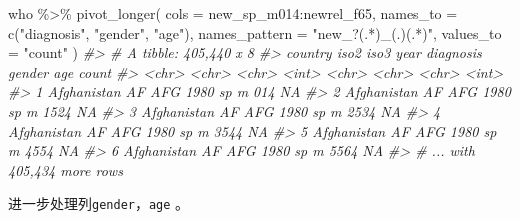 \documentclass[
]{book}
\newenvironment{Shaded}{\begin{snugshade}}{\end{snugshade}}
\newcommand{\AttributeTok}[1]{\textcolor[rgb]{0.77,0.63,0.00}{#1}}
\newcommand{\CommentTok}[1]{\textcolor[rgb]{0.56,0.35,0.01}{\textit{#1}}}
\newcommand{\FunctionTok}[1]{\textcolor[rgb]{0.00,0.00,0.00}{#1}}
\newcommand{\NormalTok}[1]{#1}
\newcommand{\SpecialCharTok}[1]{\textcolor[rgb]{0.00,0.00,0.00}{#1}}
\newcommand{\StringTok}[1]{\textcolor[rgb]{0.31,0.60,0.02}{#1}}
\begin{document}
\begin{Shaded}
\begin{Highlighting}[]
\NormalTok{who }\SpecialCharTok{\%\textgreater{}\%} \FunctionTok{pivot\_longer}\NormalTok{(}
  \AttributeTok{cols =}\NormalTok{ new\_sp\_m014}\SpecialCharTok{:}\NormalTok{newrel\_f65,}
  \AttributeTok{names\_to =} \FunctionTok{c}\NormalTok{(}\StringTok{"diagnosis"}\NormalTok{, }\StringTok{"gender"}\NormalTok{, }\StringTok{"age"}\NormalTok{), }
  \AttributeTok{names\_pattern =} \StringTok{"new\_?(.*)\_(.)(.*)"}\NormalTok{,}
  \AttributeTok{values\_to =} \StringTok{"count"}
\NormalTok{)}
\CommentTok{\#\textgreater{} \# A tibble: 405,440 x 8}
\CommentTok{\#\textgreater{}   country     iso2  iso3   year diagnosis gender age   count}
\CommentTok{\#\textgreater{}   \textless{}chr\textgreater{}       \textless{}chr\textgreater{} \textless{}chr\textgreater{} \textless{}int\textgreater{} \textless{}chr\textgreater{}     \textless{}chr\textgreater{}  \textless{}chr\textgreater{} \textless{}int\textgreater{}}
\CommentTok{\#\textgreater{} 1 Afghanistan AF    AFG    1980 sp        m      014      NA}
\CommentTok{\#\textgreater{} 2 Afghanistan AF    AFG    1980 sp        m      1524     NA}
\CommentTok{\#\textgreater{} 3 Afghanistan AF    AFG    1980 sp        m      2534     NA}
\CommentTok{\#\textgreater{} 4 Afghanistan AF    AFG    1980 sp        m      3544     NA}
\CommentTok{\#\textgreater{} 5 Afghanistan AF    AFG    1980 sp        m      4554     NA}
\CommentTok{\#\textgreater{} 6 Afghanistan AF    AFG    1980 sp        m      5564     NA}
\CommentTok{\#\textgreater{} \# ... with 405,434 more rows}
\end{Highlighting}
\end{Shaded}

进一步处理列\texttt{gender}，\texttt{age} 。
\end{document}
